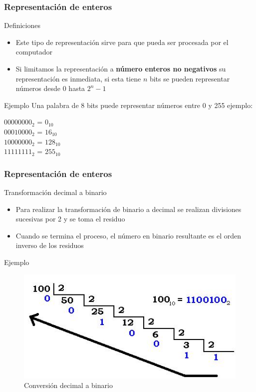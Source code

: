\documentclass{beamer}
\begin{document}
\begin{frame}
	\frametitle{Representación de enteros}
	\begin{block}{Definiciones}
		\begin{itemize}
			\item Este tipo de representación sirve para que pueda ser procesada por el computador
			\item Si limitamos la representación a \textbf{número enteros no negativos} su representación es inmediata, si esta tiene $n$ bits se pueden representar números desde $0$ hasta $2^{n}-1$
		\end{itemize}
	\end{block}	
	\begin{exampleblock}{Ejemplo}
		Una palabra de 8 bits puede representar números entre 0 y 255 ejemplo:
		\begin{center}
			$00000000_{2}$ = $0_{10}$ \\
			$00010000_{2}$ = $16_{10}$ \\
			$10000000_{2}$ = $128_{10}$ \\
			$11111111_{2}$ = $255_{10}$
		\end{center}
	\end{exampleblock}
\end{frame}


\begin{frame}
	\frametitle{Representación de enteros}
	\begin{block}{Transformación decimal a binario}
		\begin{itemize}
			\item Para realizar la transformación de binario a decimal se realizan divisiones sucesivas por 2 y se toma el residuo
			\item Cuando se termina el proceso, el número en binario resultante es el orden inverso de los residuos
		\end{itemize}
	\end{block}	
	\begin{exampleblock}{Ejemplo}
		\begin{figure}[H]
			\centering
			\includegraphics[scale=0.4]{imagenes/Conversion.jpg}
			\caption{Conversión decimal a binario}
			\end{figure}		
	\end{exampleblock}
\end{frame}
\end{document}
